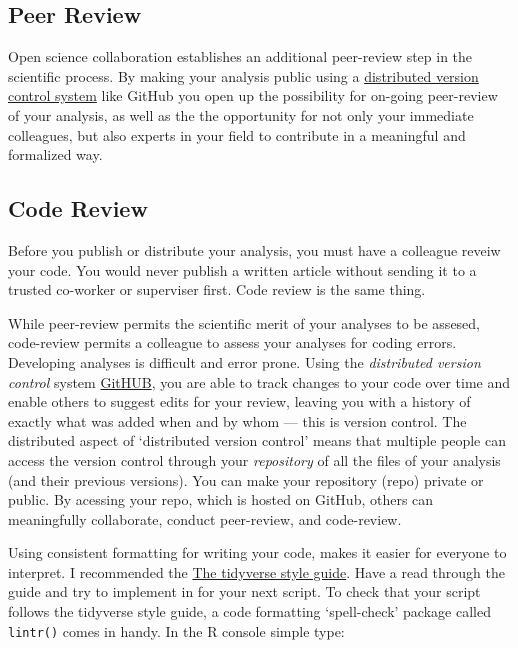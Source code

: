 \documentclass[]{book}
\begin{document}
\subsection{Peer Review}\label{peer-review}

Open science collaboration establishes an additional peer-review step in
the scientific process. By making your analysis public using a
\href{https://git-scm.com/book/en/v2/Getting-Started-About-Version-Control}{distributed
version control system} like GitHub you open up the possibility for
on-going peer-review of your analysis, as well as the the opportunity
for not only your immediate colleagues, but also experts in your field
to contribute in a meaningful and formalized way.

\subsection{Code Review}\label{code-review}

Before you publish or distribute your analysis, you must have a
colleague reveiw your code. You would never publish a written article
without sending it to a trusted co-worker or superviser first. Code
review is the same thing.

While peer-review permits the scientific merit of your analyses to be
assesed, code-review permits a colleague to assess your analyses for
coding errors. Developing analyses is difficult and error prone. Using
the \emph{distributed version control} system
\href{https://git-scm.com/book/en/v2/Getting-Started-About-Version-Control}{GitHUB},
you are able to track changes to your code over time and enable others
to suggest edits for your review, leaving you with a history of exactly
what was added when and by whom --- this is version control. The
distributed aspect of `distributed version control' means that multiple
people can access the version control through your \emph{repository} of
all the files of your analysis (and their previous versions). You can
make your repository (repo) private or public. By acessing your repo,
which is hosted on GitHub, others can meaningfully collaborate, conduct
peer-review, and code-review.

Using consistent formatting for writing your code, makes it easier for
everyone to interpret. I recommended the
\href{http://style.tidyverse.org}{The tidyverse style guide}. Have a
read through the guide and try to implement in for your next script. To
check that your script follows the tidyverse style guide, a code
formatting `spell-check' package called \texttt{lintr()} comes in handy.
In the R console simple type:
\end{document}
